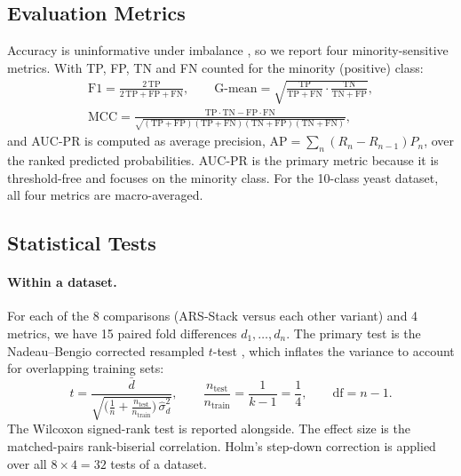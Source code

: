 \documentclass[11pt,a4paper]{article}
\begin{document}
\subsection{Evaluation Metrics}

Accuracy is uninformative under imbalance \cite{he2009learning}, so we report four minority-sensitive metrics. With TP, FP, TN and FN counted for the minority (positive) class:
\begin{gather}
\mathrm{F1}=\frac{2\,\mathrm{TP}}{2\,\mathrm{TP}+\mathrm{FP}+\mathrm{FN}},\qquad
\text{G-mean}=\sqrt{\frac{\mathrm{TP}}{\mathrm{TP}+\mathrm{FN}}\cdot\frac{\mathrm{TN}}{\mathrm{TN}+\mathrm{FP}}},\\
\mathrm{MCC}=\frac{\mathrm{TP}\cdot\mathrm{TN}-\mathrm{FP}\cdot\mathrm{FN}}{\sqrt{(\mathrm{TP}+\mathrm{FP})(\mathrm{TP}+\mathrm{FN})(\mathrm{TN}+\mathrm{FP})(\mathrm{TN}+\mathrm{FN})}},
\end{gather}
and AUC-PR is computed as average precision, $\mathrm{AP}=\sum_n (R_n-R_{n-1})P_n$, over the ranked predicted probabilities. AUC-PR is the primary metric because it is threshold-free and focuses on the minority class. For the 10-class yeast dataset, all four metrics are macro-averaged.

\subsection{Statistical Tests}

\paragraph{Within a dataset.} For each of the 8 comparisons (ARS-Stack versus each other variant) and 4 metrics, we have 15 paired fold differences $d_1,\dots,d_n$. The primary test is the Nadeau--Bengio corrected resampled $t$-test \cite{nadeau2003inference}, which inflates the variance to account for overlapping training sets:
\begin{equation}
t=\frac{\bar d}{\sqrt{\big(\frac{1}{n}+\frac{n_{\mathrm{test}}}{n_{\mathrm{train}}}\big)\,\hat\sigma_d^2}},\qquad \frac{n_{\mathrm{test}}}{n_{\mathrm{train}}}=\frac{1}{k-1}=\frac14,\qquad \mathrm{df}=n-1.\label{eq:nb}
\end{equation}
The Wilcoxon signed-rank test is reported alongside. The effect size is the matched-pairs rank-biserial correlation. Holm's step-down correction is applied over all $8\times4=32$ tests of a dataset.
\end{document}

